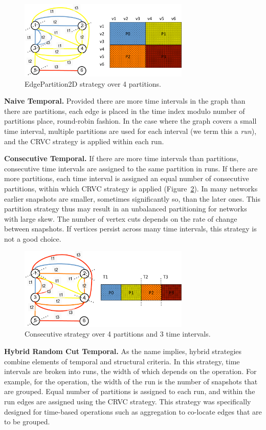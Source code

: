 \begin{figure}[t!]
\includegraphics[width=3.2in]{figs/E2D.pdf}
\caption{EdgePartition2D strategy over 4 partitions.}
\label{fig:e2d}
\end{figure}

{\bf Naive Temporal.}  Provided there are more time intervals in the
graph than there are partitions, each edge is placed in the time index
modulo number of partitions place, round-robin fashion.  In the case
where the graph covers a small time interval, multiple partitions are
used for each interval (we term this a {\em run}), and the CRVC
strategy is applied within each run.

{\bf Consecutive Temporal.}  If there are more time intervals than
partitions, consecutive time intervals are assigned to the same
partition in runs.  If there are more partitions, each time interval
is assigned an equal number of consecutive partitions, within which
CRVC strategy is applied (Figure~\ref{fig:consecutive}).  In many
networks earlier snapshots are smaller, sometimes significantly so,
than the later ones.  This partition strategy thus may result in an
unbalanced partitioning for networks with large skew.  The number of
vertex cuts depends on the rate of change between snapshots.  If
vertices persist across many time intervals, this strategy is not a
good choice.

\begin{figure}[t!]
\includegraphics[width=3.2in]{figs/Consecutive.pdf}
\caption{Consecutive strategy over 4 partitions and 3 time intervals.}
\label{fig:consecutive}
\end{figure}

{\bf Hybrid Random Cut Temporal.}  As the name implies, hybrid
strategies combine elements of temporal and structural criteria.  In
this strategy, time intervals are broken into runs, the width of which
depends on the operation.  For example, for the 
operation, the width of the run is the number of snapshots that are
grouped.  Equal number of partitions is assigned to each run, and
within the run edges are assigned using the CRVC strategy.  This
strategy was specifically designed for time-based operations such as
aggregation to co-locate edges that are to be grouped.

